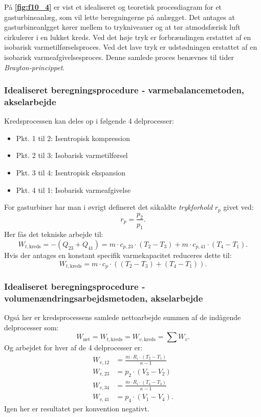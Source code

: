 På \textbf{\autoref{fig:f10_4}} er vist et idealiseret og teoretisk procesdiagram for et gasturbineanlæg, som vil lette beregningerne på anlægget. Det antages at gasturbineanlgget kører mellem to trykniveauer og at tør atmodsfærisk luft cirkulerer i en lukket kreds. Ved det høje tryk er forbrændingen erstattet af en isobarisk varmetilførselsproces. Ved det lave tryk er udstødningen erstattet af en isobarisk varmeafgivelsesproces. Denne samlede proces benævnes til tider \textit{Brayton-princippet}.

\subsubsection{Idealiseret beregningsprocedure ‐ varmebalancemetoden, akselarbejde}
Kredsprocessen kan deles op i følgende 4 delprocesser:
\begin{itemize}
  \item Pkt. 1 til 2: Isentropisk kompression
  \item Pkt. 2 til 3: Isobarisk varmetilførsel
  \item Pkt. 3 til 4: Isentropisk ekspansion
  \item Pkt. 4 til 1: Isobarisk varmeafgivelse
\end{itemize}
For gasturbiner har man i øvrigt defineret det såkaldte \textit{trykforhold} $r_p$ givet ved:
\[ 
r_p = \frac{p_2}{p_1}
.\]
Her fås det tekniske arbejde til:
\[ 
W_{t, \mathrm{kreds}} = - \left( Q_{23} + Q_{41} \right) = m \cdot c_{p,23} \cdot \left( T_2 - T_3 \right) + m \cdot c_{p,41} \cdot \left( T_4 - T_1 \right)
.\]
Hvis der antages en konstant specifik varmekapacitet reduceres dette til:
\[ 
W_{t, \mathrm{kreds}} = m \cdot c_p \cdot \left( \left( T_2 - T_3 \right) + \left( T_4 - T_1 \right)  \right) 
.\]

\subsubsection{Idealiseret beregningsprocedure ‐ volumenændringsarbejdsmetoden, akselarbejde}
Også her er kredsprocessens samlede nettoarbejde summen af de indågende delprocesser som:
\[ 
W_{\mathrm{net}} = W_{t, \mathrm{kreds}} = W_{v, \mathrm{kreds}} = \sum W_v
.\]
Og arbejdet for hver af de 4 delprocesser er:
\begin{align*}
  W_{v, 12} &= \frac{m \cdot R_i \cdot \left( T_2 - T_1 \right) }{\kappa - 1} \\
  W_{v, 23} &= p_2 \cdot \left( V_3 - V_2 \right)  \\
  W_{v, 34} &= \frac{m \cdot R_i \cdot \left( T_4 - T_3 \right) }{\kappa - 1} \\
  W_{v, 41} &= p_4 \cdot \left( V_1 - V_4 \right) 
.\end{align*}
Igen her er resultatet per konvention negativt.

